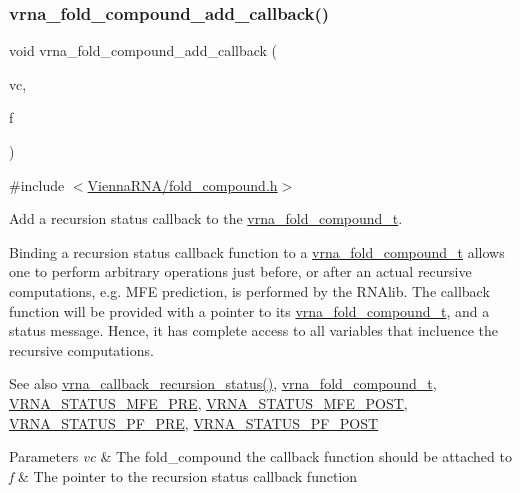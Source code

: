 \subsubsection{\texorpdfstring{vrna\+\_\+fold\+\_\+compound\+\_\+add\+\_\+callback()}{vrna\_fold\_compound\_add\_callback()}}
{\footnotesize\ttfamily void vrna\+\_\+fold\+\_\+compound\+\_\+add\+\_\+callback (\begin{DoxyParamCaption}\item[{\hyperlink{group__fold__compound_ga1b0cef17fd40466cef5968eaeeff6166}{vrna\+\_\+fold\+\_\+compound\+\_\+t} $\ast$}]{vc,  }\item[{\hyperlink{group__fold__compound_gac86036fa8cad1108832335063243cdc8}{vrna\+\_\+callback\+\_\+recursion\+\_\+status} $\ast$}]{f }\end{DoxyParamCaption})}



{\ttfamily \#include $<$\hyperlink{fold__compound_8h}{Vienna\+R\+N\+A/fold\+\_\+compound.\+h}$>$}



Add a recursion status callback to the \hyperlink{group__fold__compound_ga1b0cef17fd40466cef5968eaeeff6166}{vrna\+\_\+fold\+\_\+compound\+\_\+t}. 

Binding a recursion status callback function to a \hyperlink{group__fold__compound_ga1b0cef17fd40466cef5968eaeeff6166}{vrna\+\_\+fold\+\_\+compound\+\_\+t} allows one to perform arbitrary operations just before, or after an actual recursive computations, e.\+g. M\+FE prediction, is performed by the R\+N\+Alib. The callback function will be provided with a pointer to its \hyperlink{group__fold__compound_ga1b0cef17fd40466cef5968eaeeff6166}{vrna\+\_\+fold\+\_\+compound\+\_\+t}, and a status message. Hence, it has complete access to all variables that incluence the recursive computations.

\begin{DoxySeeAlso}{See also}
\hyperlink{group__fold__compound_gac86036fa8cad1108832335063243cdc8}{vrna\+\_\+callback\+\_\+recursion\+\_\+status()}, \hyperlink{group__fold__compound_ga1b0cef17fd40466cef5968eaeeff6166}{vrna\+\_\+fold\+\_\+compound\+\_\+t}, \hyperlink{group__fold__compound_ga1a5053dc8acbb0111e852988726f07d6}{V\+R\+N\+A\+\_\+\+S\+T\+A\+T\+U\+S\+\_\+\+M\+F\+E\+\_\+\+P\+RE}, \hyperlink{group__fold__compound_ga47c900ca76e56e59e2e83a06e0bde641}{V\+R\+N\+A\+\_\+\+S\+T\+A\+T\+U\+S\+\_\+\+M\+F\+E\+\_\+\+P\+O\+ST}, \hyperlink{group__fold__compound_ga91795d35ebdb6f32be50459f24b3d114}{V\+R\+N\+A\+\_\+\+S\+T\+A\+T\+U\+S\+\_\+\+P\+F\+\_\+\+P\+RE}, \hyperlink{group__fold__compound_ga1c6fa243533fd026e50f7d595eaaa565}{V\+R\+N\+A\+\_\+\+S\+T\+A\+T\+U\+S\+\_\+\+P\+F\+\_\+\+P\+O\+ST}
\end{DoxySeeAlso}

\begin{DoxyParams}{Parameters}
{\em vc} & The fold\+\_\+compound the callback function should be attached to \\
\hline
{\em f} & The pointer to the recursion status callback function \\
\hline
\end{DoxyParams}
